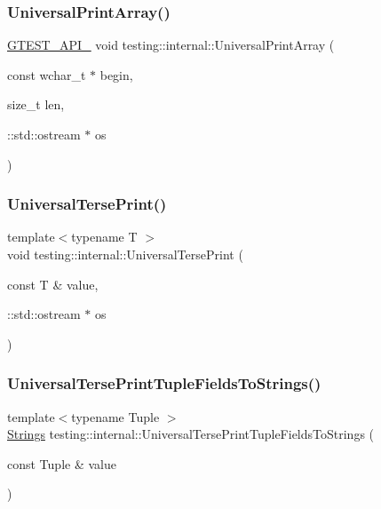 \subsubsection{\texorpdfstring{Universal\+Print\+Array()}{UniversalPrintArray()}\hspace{0.1cm}{\footnotesize\ttfamily [3/3]}}
{\footnotesize\ttfamily \hyperlink{gtest-port_8h_aa73be6f0ba4a7456180a94904ce17790}{G\+T\+E\+S\+T\+\_\+\+A\+P\+I\+\_\+} void testing\+::internal\+::\+Universal\+Print\+Array (\begin{DoxyParamCaption}\item[{const wchar\+\_\+t $\ast$}]{begin,  }\item[{size\+\_\+t}]{len,  }\item[{\+::std\+::ostream $\ast$}]{os }\end{DoxyParamCaption})}

\mbox{\label{namespacetesting_1_1internal_afa92f5a284929dc3723e654a25feb7b9}} 
\subsubsection{\texorpdfstring{Universal\+Terse\+Print()}{UniversalTersePrint()}}
{\footnotesize\ttfamily template$<$typename T $>$ \\
void testing\+::internal\+::\+Universal\+Terse\+Print (\begin{DoxyParamCaption}\item[{const T \&}]{value,  }\item[{\+::std\+::ostream $\ast$}]{os }\end{DoxyParamCaption})}

\mbox{\label{namespacetesting_1_1internal_a7e60d1478b074801c766eeee9be6c772}} 
\subsubsection{\texorpdfstring{Universal\+Terse\+Print\+Tuple\+Fields\+To\+Strings()}{UniversalTersePrintTupleFieldsToStrings()}}
{\footnotesize\ttfamily template$<$typename Tuple $>$ \\
\hyperlink{namespacetesting_1_1internal_a50003bb76ec2934be1062be11efba8bf}{Strings} testing\+::internal\+::\+Universal\+Terse\+Print\+Tuple\+Fields\+To\+Strings (\begin{DoxyParamCaption}\item[{const Tuple \&}]{value }\end{DoxyParamCaption})}



